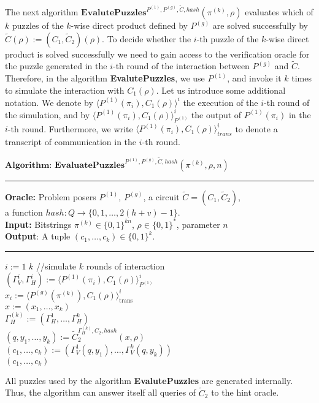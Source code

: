 %
%
The next algorithm $\textbf{EvalutePuzzles}^{P^{(1)}, P^{(g)}, \widetilde{C}, hash}(\pi^{(k)}, \rho)$
evaluates which of $k$ puzzles of the $k$-wise direct product defined by $P^{(g)}$ are solved successfully by $\widetilde{C}(\rho) := (C_1,\widetilde{C}_2)(\rho)$.
To decide whether the $i$-th puzzle of the $k$-wise direct product is solved successfully we need to gain access to the verification oracle
for the puzzle generated in the $i$-th round of the interaction between $P^{(g)}$ and $\widetilde{C}$.
Therefore, in the algorithm \textbf{EvalutePuzzles}, we use $P^{(1)}$, and invoke it $k$ times to simulate the interaction with $C_1(\rho)$.
Let us introduce some additional notation. We denote by $\langle P^{(1)}(\pi_i), C_1(\rho)\rangle^i$ the execution of
the $i$-th round of the simulation, and by $\langle P^{(1)}(\pi_i), C_1(\rho)\rangle^i_{P^{(1)}}$ the output of $P^{(1)}(\pi_i)$ in the $i$-th round.
Furthermore, we write $\langle P^{(1)}(\pi_i), C_1(\rho)\rangle^i_{trans}$ to denote a transcript of communication in the $i$-th round.
%
\begin{codeblock}
  $\textbf{Algorithm: EvaluatePuzzles}^{P^{(1)}, P^{(g)}, \widetilde{C}, hash}(\pi^{(k)}, \rho, n)$
  \medskip \hrule \medskip
  \textbf{Oracle:}  Problem posers $P^{(1)}$, $P^{(g)}$, a circuit $\widetilde{C} = (C_1, \widetilde{C}_2)$,\\
  \IndII a function $hash : Q \rightarrow \{0,1,\dots, 2(h+v)-1\}$.\\
  \textbf{Input:} Bitstrings $\pi^{(k)} \in \{0,1\}^{kn}$, $\rho \in \{0,1\}^{*}$, parameter $n$\\
  \textbf{Output}: A tuple $(c_1, \dots, c_k) \in \{0,1\}^{k}$.
  \medskip\hrule\medskip
  \For $i:=1$ \To $k$ \Do \IndII //simulate $k$ rounds of interaction \\
  \IndI $(\Gamma_V^{i}, \Gamma_H^{i}) := \langle P^{(1)}(\pi_i), C_1(\rho) \rangle_{P^{(1)}}^i$\\
  \IndI $x_i := \langle P^{(g)}(\pi^{(k)}), C_1(\rho) \rangle^i_{\text{trans}}$ \\
  $x := (x_1, \dots, x_k)$ \\
  $\Gamma_H^{(k)} := (\Gamma_H^1, \dots, \Gamma_H^k)$ \\
  $(q, y_1, \dots, y_k) := \widetilde{C}_2^{\Gamma_H^{(k)}, C_2, hash} (x, \rho)$ \\
  $(c_1, \dots, c_k) := (\Gamma_V^{1}(q, y_1), \dots, \Gamma_V^{k}(q, y_k))$\\
  \Return $(c_1, \dots, c_k)$
\end{codeblock}
%
All puzzles used by the algorithm \textbf{EvalutePuzzles} are generated internally.
Thus, the algorithm can answer itself all queries of $\widetilde{C}_2$ to the hint oracle.

